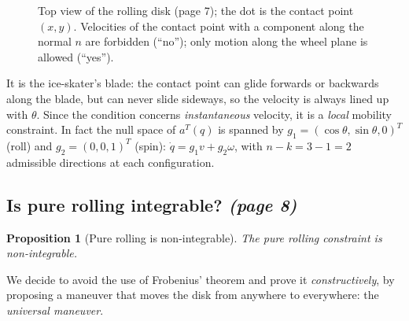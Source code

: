 \documentclass[11pt,a4paper]{article}
\theoremstyle{definition}
\theoremstyle{plain}
\newtheorem{proposition}[definition]{Proposition}
\theoremstyle{remark}
\begin{document}
\begin{figure}[H]
\centering
{}
\caption{Top view of the rolling disk (page 7); the dot is the contact point $(x,y)$. Velocities of the contact point with a component along the normal $n$ are forbidden (``no''); only motion along the wheel plane is allowed (``yes'').}
\end{figure}
 
\begin{intuition}
It is the ice-skater's blade: the contact point can glide forwards or backwards along the blade, but can never slide sideways, so the velocity is always lined up with $\theta$. Since the condition concerns \emph{instantaneous} velocity, it is a \emph{local} mobility constraint. In fact the null space of $a^{T}(q)$ is spanned by $g_1=(\cos\theta,\sin\theta,0)^{T}$ (roll) and $g_2=(0,0,1)^{T}$ (spin): $\dot q=g_1v+g_2\omega$, with $n-k=3-1=2$ admissible directions at each configuration.
\end{intuition}
 
\subsection{Is pure rolling integrable? \emph{(page 8)}}
 
\begin{proposition}[Pure rolling is non-integrable]\label{prop:frobroll}
The pure rolling constraint is non-integrable.
\end{proposition}

 
We decide to avoid the use of Frobenius' theorem and prove it \emph{constructively}, by proposing a maneuver that moves the disk from anywhere to everywhere: the \emph{universal maneuver}.
 
\end{document}
